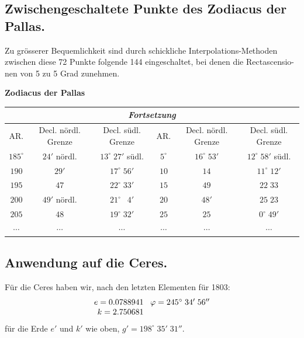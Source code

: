 \documentclass[12pt,a4paper]{article}
\begin{document}
\newpage
\subsection{Zwischengeschaltete Punkte des Zodiacus der Pallas.}

Zu grösserer Bequemlichkeit sind durch schickliche Interpolations-Methoden
zwischen diese 72 Punkte folgende 144 eingeschaltet, bei denen die Rectascensio-
nen von 5 zu 5 Grad zunehmen.

\begin{center}
\small
\textbf{Zodiacus der Pallas}\\[4pt]
\begin{longtable}{|c|c|c||c|c|c|}
\hline
\endfirsthead
\hline
\endhead
\multicolumn{6}{|c|}{\textit{Fortsetzung}}\\
\hline
\endhead
AR. & \multicolumn{1}{c|}{Decl. nördl. Grenze} & Decl. südl. Grenze &
AR. & Decl. nördl. Grenze & Decl. südl. Grenze \\
\hline
$185^{\circ}$ & $24'$ nördl. & $13^{\circ}\;27'$ südl. &
$5^{\circ}$ & $16^{\circ}\;53'$ & $12^{\circ}\;58'$ südl.\\
$190$ & $29'$ & $17^{\circ}\;56'$ &
$10$ & $14$ & $11^{\circ}\;12'$\\
$195$ & $47$ & $22^{\circ}\;33'$ &
$15$ & $49$ & $22\;33$\\
$200$ & $49'$ nördl. & $21^{\circ}\;\phantom{0}4'$ &
$20$ & $48'$ & $25\;23$\\
$205$ & $48$ & $19^{\circ}\;32'$ &
$25$ & $25$ & $0^{\circ}\;49'$\\
$\cdots$ & $\cdots$ & $\cdots$ &
$\cdots$ & $\cdots$ & $\cdots$\\
\hline
\end{longtable}
\end{center}

\subsection{Anwendung auf die Ceres.}

Für die Ceres haben wir, nach den letzten Elementen für 1803:
\[
\begin{array}{r@{\;\;\;}l}
e = 0.0788941 & \varphi = 245^{\circ}\;34'\;56''\\
k = 2.750681
\end{array}
\]
für die Erde $e'$ und $k'$ wie oben, $g' = 198^{\circ}\;35'\;31''$.
\end{document}
